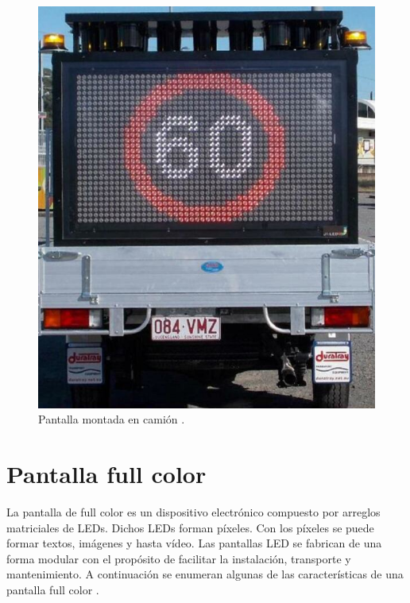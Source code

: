 \begin{figure}[htpb]
	\centering
	\includegraphics[scale=1]{../Figures/vmstruck.png} 
	\caption{Pantalla montada en camión \protect\footnotemark.}
	\label{fig:vmsc}
\end{figure}


\section{Pantalla full color}

La pantalla de full color es un dispositivo electrónico compuesto por arreglos matriciales de LEDs. Dichos LEDs forman píxeles. Con los píxeles se puede formar textos, imágenes y hasta vídeo. Las pantallas LED se fabrican de una forma modular con el propósito de facilitar la instalación, transporte y mantenimiento. A continuación se enumeran algunas de las características de una pantalla full color \citep{WIKIPANTALLAFULLCOLOR}.


